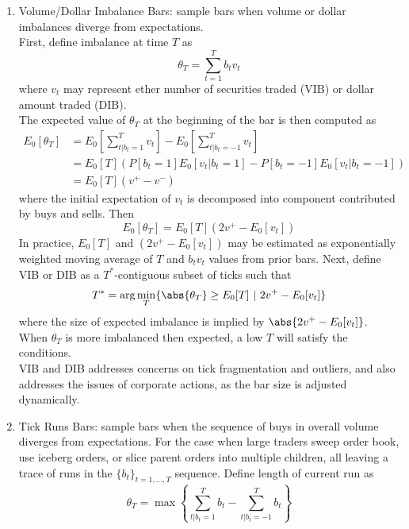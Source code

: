 \begin{remark}
\begin{enumerate}[label=\roman*.]
\item Volume/Dollar Imbalance Bars: sample bars when volume or dollar imbalances diverge from expectations.\\
First, define imbalance at time $T$ as
\begin{equation*}
\theta_T = \sum\limits_{t=1}^T b_t v_t \nonumber
\end{equation*}
where $v_t$ may represent ether number of securities traded (VIB) or dollar amount traded (DIB).\\
The expected value of $\theta_T$ at the beginning of the bar is then computed as
\begin{align}
E_0[\theta_T] &= E_0 \left[ \sum\limits_{t \vert b_t = 1}^T v_t \right] - E_0 \left[ \sum\limits_{t \vert b_t = -1}^T v_t \right] \nonumber \\
&= E_0[T] (P[b_t = 1]E_0[v_t \vert b_t = 1] - P[b_t = -1]E_0[v_t \vert b_t = -1]) \nonumber \\
&= E_0[T] (v^+ - v^-) \nonumber
\end{align}
where the initial expectation of $v_t$ is decomposed into component contributed by buys and sells. Then
\begin{equation*}
E_0[\theta_T] = E_0[T] (2v^+ - E_0 [v_t]) \nonumber
\end{equation*}
In practice, $E_0[T]$ and $(2v^+ - E_0 [v_t])$ may be estimated as exponentially weighted moving average of $T$ and $b_t v_t$ values from prior bars. Next, define VIB or DIB as a $T^*$-contiguous subset of ticks such that
\begin{equation*}
T^* = \arg \min_T \{ \abs{\theta_T} \geq E_0[T] \ \vert \ 2v^+ - E_0[v_t] \} \nonumber
\end{equation*}
where the size of expected imbalance is implied by $\abs{2v^+ - E_0[v_t]}$.\\
When $\theta_T$ is more imbalanced then expected, a low $T$ will satisfy the conditions.\\
VIB and DIB addresses concerns on tick fragmentation and outliers, and also addresses the issues of corporate actions, as the bar size is adjusted dynamically.
\item Tick Runs Bars: sample bars when the sequence of buys in overall volume diverges from expectations. For the case when large traders sweep order book, use iceberg orders, or slice parent orders into multiple children, all leaving a trace of runs in the $\{b_t\}_{t = 1, \ldots, T}$ sequence. Define length of current run as
\begin{equation*}
\theta_T = \max \left\{ \sum\limits_{t \vert b_t = 1}^T b_t - \sum\limits_{t \vert b_t = -1}^T b_t  \right\} \nonumber

\end{equation*}
\end{enumerate}
\end{remark}
